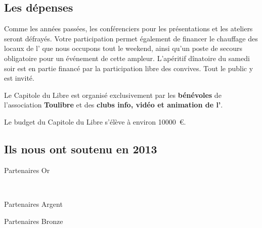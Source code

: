 \documentclass{cdl_sponsor}
\begin{document}
\subsection{Les dépenses}

Comme les années passées, les conférenciers pour les présentations et les ateliers seront défrayés. Votre participation permet également de financer le chauffage des locaux de l' que nous occupons tout le weekend, ainsi qu'un poste de secours obligatoire pour un événement de cette ampleur. L'apéritif dînatoire du samedi soir est en partie financé par la participation libre des convives. Tout le public y est invité.

\Separateur

Le Capitole du Libre est organisé exclusivement par les \textbf{bénévoles} de l'association \textbf{Toulibre} et des \textbf{clubs info, vidéo et animation de l'}.

\Separateur
Le budget du Capitole du Libre s'élève à environ \SI{10000}{\euro}.

\newpage
\subsection{Ils nous ont soutenu en 2013}

\begin{center}
{\Large \textcolor{Cdl}{Partenaires Or}}

\hspace{1cm}
\hspace{1cm}
 \\
\hspace{1cm}
\hspace{1cm}

\Separateur

{\Large \textcolor{Cdl}{Partenaires Argent}}

\Separateur


\Separateur

{\Large \textcolor{Cdl}{Partenaires Bronze}}

\Separateur

 \hspace{1cm}
\hspace{1cm}
 \\
 \hspace{1cm}
\end{center}
\end{document}
